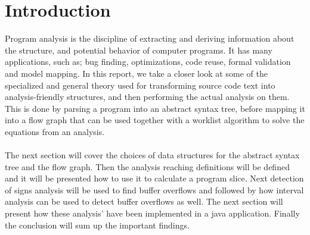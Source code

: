 \section{Introduction}
Program analysis is the discipline of extracting and deriving information about the structure, and potential behavior of computer programs. It has many applications, such as; bug finding, optimizations, code reuse, formal validation and model mapping. In this report, we take a closer look at some of the specialized and general theory used for transforming source code text into analysis-friendly structures, and then performing the actual analysis on them. This is done by parsing a program into an abstract syntax tree, before mapping it into a flow graph that can be used together with a worklist algorithm to solve the equations from an analysis.
\\
\\
The next section will cover the choices of data structures for the abstract syntax tree and the flow graph. Then the analysis reaching definitions will be defined and it will be presented how to use it to calculate a program slice. Next detection of signs analysis will be used to find buffer overflows and followed by how interval analysis can be used to detect buffer overflows as well. The next section will present how these analysis' have been implemented in a java application. Finally the conclusion will sum up the important findings.